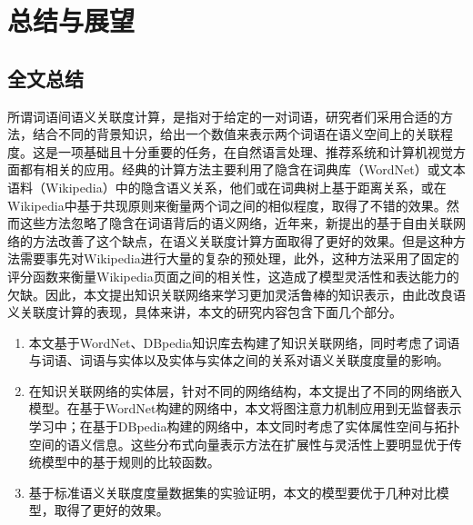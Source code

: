 \chapter{总结与展望}
\label{chap:chap07}

\section{全文总结}

所谓词语间语义关联度计算，是指对于给定的一对词语，研究者们采用合适的方法，结合不同的背景知识，给出一个数值来表示两个词语在语义空间上的关联程度。这是一项基础且十分重要的任务，在自然语言处理、推荐系统和计算机视觉方面都有相关的应用。经典的计算方法主要利用了隐含在词典库（WordNet）或文本语料（Wikipedia）中的隐含语义关系，他们或在词典树上基于距离关系，或在Wikipedia中基于共现原则来衡量两个词之间的相似程度，取得了不错的效果。然而这些方法忽略了隐含在词语背后的语义网络，近年来，新提出的基于自由关联网络的方法改善了这个缺点，在语义关联度计算方面取得了更好的效果。但是这种方法需要事先对Wikipedia进行大量的复杂的预处理，此外，这种方法采用了固定的评分函数来衡量Wikipedia页面之间的相关性，这造成了模型灵活性和表达能力的欠缺。因此，本文提出知识关联网络来学习更加灵活鲁棒的知识表示，由此改良语义关联度计算的表现，具体来讲，本文的研究内容包含下面几个部分。
\begin{enumerate}[（1）]
    \item 本文基于WordNet、DBpedia知识库去构建了知识关联网络，同时考虑了词语与词语、词语与实体以及实体与实体之间的关系对语义关联度度量的影响。
    \item 在知识关联网络的实体层，针对不同的网络结构，本文提出了不同的网络嵌入模型。在基于WordNet构建的网络中，本文将图注意力机制应用到无监督表示学习中；在基于DBpedia构建的网络中，本文同时考虑了实体属性空间与拓扑空间的语义信息。这些分布式向量表示方法在扩展性与灵活性上要明显优于传统模型中的基于规则的比较函数。
    \item 基于标准语义关联度度量数据集的实验证明，本文的模型要优于几种对比模型，取得了更好的效果。
\end{enumerate}

